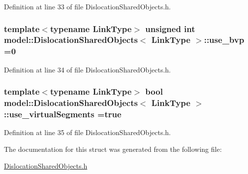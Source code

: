 Definition at line 33 of file Dislocation\+Shared\+Objects.\+h.

\hypertarget{structmodel_1_1_dislocation_shared_objects_a9f12289f60f8fae2261b5bd7ea531401}{}
\subsubsection[{use\+\_\+bvp}]{\setlength{\rightskip}{0pt plus 5cm}template$<$typename Link\+Type$>$ unsigned int {\bf model\+::\+Dislocation\+Shared\+Objects}$<$ {\bf Link\+Type} $>$\+::use\+\_\+bvp =0\hspace{0.3cm}{\ttfamily [static]}}\label{structmodel_1_1_dislocation_shared_objects_a9f12289f60f8fae2261b5bd7ea531401}


Definition at line 34 of file Dislocation\+Shared\+Objects.\+h.

\hypertarget{structmodel_1_1_dislocation_shared_objects_a8cdf9f81f79ca2f7740c1f5b379118bd}{}
\subsubsection[{use\+\_\+virtual\+Segments}]{\setlength{\rightskip}{0pt plus 5cm}template$<$typename Link\+Type$>$ bool {\bf model\+::\+Dislocation\+Shared\+Objects}$<$ {\bf Link\+Type} $>$\+::use\+\_\+virtual\+Segments =true\hspace{0.3cm}{\ttfamily [static]}}\label{structmodel_1_1_dislocation_shared_objects_a8cdf9f81f79ca2f7740c1f5b379118bd}


Definition at line 35 of file Dislocation\+Shared\+Objects.\+h.



The documentation for this struct was generated from the following file\+:\begin{DoxyCompactItemize}
\item 
\hyperlink{_dislocation_shared_objects_8h}{Dislocation\+Shared\+Objects.\+h}\end{DoxyCompactItemize}
